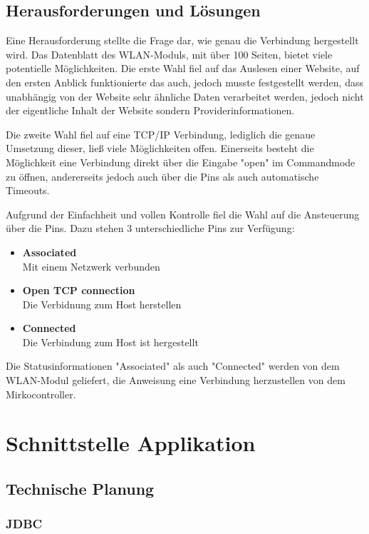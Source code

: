   \subsection{Herausforderungen und Lösungen}
  Eine Herausforderung stellte die Frage dar, wie genau die Verbindung hergestellt wird. Das Datenblatt des WLAN-Moduls, mit über 100 Seiten, bietet viele potentielle Möglichkeiten.
  Die erste Wahl fiel auf das Auslesen einer Website, auf den ersten Anblick funktionierte das auch, jedoch musste festgestellt werden, dass unabhängig von der Website sehr ähnliche
  Daten verarbeitet werden, jedoch nicht der eigentliche Inhalt der Website sondern Providerinformationen.

  Die zweite Wahl fiel auf eine TCP/IP Verbindung, lediglich die genaue Umsetzung dieser, ließ viele Möglichkeiten offen. Einerseits besteht die Möglichkeit eine Verbindung direkt
  über die Eingabe "open" im Commandmode zu öffnen, andererseits jedoch auch über die Pins als auch automatische Timeouts.

  Aufgrund der Einfachheit und vollen Kontrolle fiel die Wahl auf die Ansteuerung über die Pins.
  Dazu stehen 3 unterschiedliche Pins zur Verfügung:
  \begin{itemize}
    \item \textbf{Associated}\\
    Mit einem Netzwerk verbunden
    \item \textbf{Open TCP connection}\\
    Die Verbidnung zum Host herstellen
    \item \textbf{Connected}\\
    Die Verbindung zum Host ist hergestellt
  \end{itemize}
  Die Statusinformationen "Associated" als auch "Connected" werden von dem WLAN-Modul geliefert, die Anweisung eine Verbindung herzustellen von dem Mirkocontroller.

\pagebreak
\section{Schnittstelle Applikation}

  \subsection{Technische Planung}

	   \subsubsection{JDBC}

